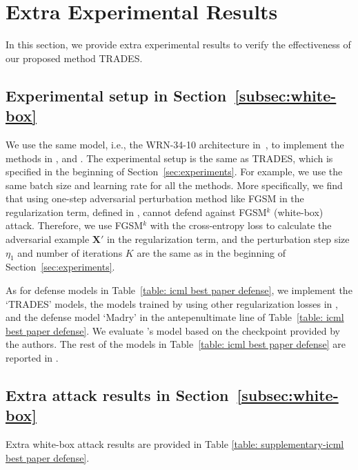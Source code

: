 \documentclass[11pt]{article}
\newcommand{\X}{\bm{X}}
\newcommand{\0}{\mathbf{0}}
\newcommand{\1}{\mathbf{1}}
\begin{document}
\section{Extra Experimental Results}
In this section, we provide extra experimental results to verify the effectiveness of our proposed method TRADES.
\subsection{Experimental setup in Section~\ref{subsec:white-box}}
We use the same model, i.e., the WRN-34-10 architecture in~\cite{zagoruyko2016wide}, to implement the methods in \cite{zheng2016improving}, \cite{kurakin2016adversarial} and \cite{ross2017improving}. The experimental setup is the same as TRADES, which is specified in the beginning of Section~\ref{sec:experiments}. For example, we use the same batch size and learning rate for all the methods. More specifically, we find that using one-step adversarial perturbation method like FGSM in the regularization term, defined in \cite{kurakin2016adversarial}, cannot defend against FGSM$^k$ (white-box) attack. Therefore, we use FGSM$^k$ with the cross-entropy loss to calculate the adversarial example $\X'$ in the regularization term, and the perturbation step size $\eta_1$ and number of iterations $K$ are the same as in the beginning of Section~\ref{sec:experiments}. 

As for defense models in Table~\ref{table: icml best paper defense}, we implement the `TRADES' models, the models trained by using other regularization losses in \cite{kurakin2016adversarial,ross2017improving,zheng2016improving}, and the defense model `Madry' in the antepenultimate line of Table~\ref{table: icml best paper defense}. We evaluate \cite{wong1805scaling}'s model based on the checkpoint provided by the authors. The rest of the models in Table~\ref{table: icml best paper defense} are reported in \cite{athalye2018obfuscated}.







\subsection{Extra attack results in Section~\ref{subsec:white-box}}


Extra white-box attack results are provided in Table \ref{table: supplementary-icml best paper defense}.
\end{document}
